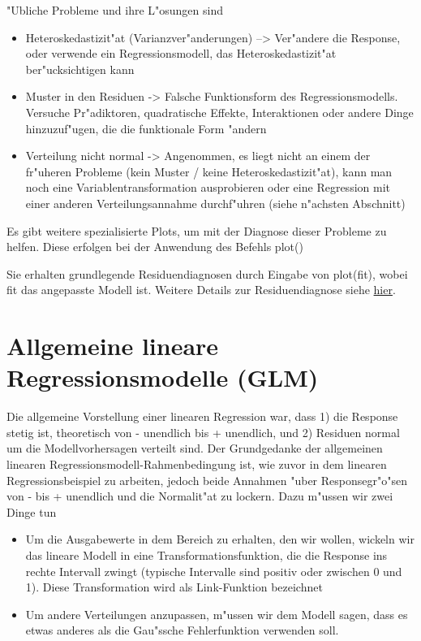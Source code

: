 \documentclass[a4paper,twoside]{tufte-book}\usepackage[]{graphicx}\usepackage[]{color}
\begin{document}
"Ubliche Probleme und ihre L"osungen sind  

\begin{itemize}
  \item Heteroskedastizit"at (Varianzver"anderungen) --> Ver"andere die Response, oder verwende ein Regressionsmodell, das Heteroskedastizit"at ber"ucksichtigen kann
  \item Muster in den Residuen -> Falsche Funktionsform des Regressionsmodells. Versuche Pr"adiktoren, quadratische Effekte, Interaktionen oder andere Dinge hinzuzuf"ugen, die die funktionale Form "andern
  \item Verteilung nicht normal -> Angenommen, es liegt nicht an einem der fr"uheren Probleme (kein Muster / keine Heteroskedastizit"at), kann man noch eine Variablentransformation ausprobieren oder eine Regression mit einer anderen Verteilungsannahme durchf"uhren (siehe n"achsten Abschnitt)
\end{itemize}  

Es gibt weitere spezialisierte Plots, um mit der Diagnose dieser Probleme zu helfen. Diese erfolgen bei der Anwendung des Befehls plot()


Sie erhalten grundlegende Residuendiagnosen durch Eingabe von plot(fit), wobei fit das angepasste Modell ist. Weitere Details zur Residuendiagnose siehe \href{http://www.statmethods.net/stats/rdiagnostics.html}{hier}.



\section{Allgemeine lineare Regressionsmodelle (GLM)}

Die allgemeine Vorstellung einer linearen Regression war, dass 1) die Response stetig ist, theoretisch von - unendlich bis + unendlich, und 2) Residuen normal um die Modellvorhersagen verteilt sind. Der Grundgedanke der allgemeinen linearen Regressionsmodell-Rahmenbedingung ist, wie zuvor in dem linearen Regressionsbeispiel zu arbeiten, jedoch beide Annahmen "uber Responsegr"o"sen von - bis + unendlich und die Normalit"at zu lockern. Dazu m"ussen wir zwei Dinge tun

\begin{itemize}
  \item Um die Ausgabewerte in dem Bereich zu erhalten, den wir wollen, wickeln wir das lineare Modell in eine Transformationsfunktion, die die Response ins rechte Intervall zwingt (typische Intervalle sind positiv oder zwischen 0 und 1). Diese Transformation wird als Link-Funktion bezeichnet
  \item Um andere Verteilungen anzupassen, m"ussen wir dem Modell sagen, dass es etwas anderes als die Gau"ssche Fehlerfunktion verwenden soll.
\end{itemize}    
   
\end{document}
